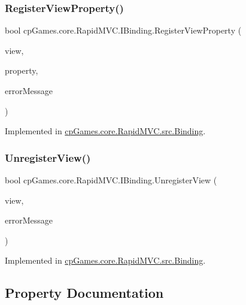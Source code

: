 \subsubsection{\texorpdfstring{RegisterViewProperty()}{RegisterViewProperty()}}
{\footnotesize\ttfamily bool cp\+Games.\+core.\+Rapid\+M\+V\+C.\+I\+Binding.\+Register\+View\+Property (\begin{DoxyParamCaption}\item[{\mbox{\hyperlink{interfacecp_games_1_1core_1_1_rapid_m_v_c_1_1_i_view}{I\+View}}}]{view,  }\item[{Property\+Info}]{property,  }\item[{out string}]{error\+Message }\end{DoxyParamCaption})}



Implemented in \mbox{\hyperlink{classcp_games_1_1core_1_1_rapid_m_v_c_1_1src_1_1_binding_aebd156eee7ea9bd0aea09c36b3a32a95}{cp\+Games.\+core.\+Rapid\+M\+V\+C.\+src.\+Binding}}.

\mbox{\label{interfacecp_games_1_1core_1_1_rapid_m_v_c_1_1_i_binding_ab36c868f3a9163935a650c30663f7a97}} 
\subsubsection{\texorpdfstring{UnregisterView()}{UnregisterView()}}
{\footnotesize\ttfamily bool cp\+Games.\+core.\+Rapid\+M\+V\+C.\+I\+Binding.\+Unregister\+View (\begin{DoxyParamCaption}\item[{\mbox{\hyperlink{interfacecp_games_1_1core_1_1_rapid_m_v_c_1_1_i_view}{I\+View}}}]{view,  }\item[{out string}]{error\+Message }\end{DoxyParamCaption})}



Implemented in \mbox{\hyperlink{classcp_games_1_1core_1_1_rapid_m_v_c_1_1src_1_1_binding_a09b069af4432f3652799483a7dd41fee}{cp\+Games.\+core.\+Rapid\+M\+V\+C.\+src.\+Binding}}.



\subsection{Property Documentation}
\mbox{\label{interfacecp_games_1_1core_1_1_rapid_m_v_c_1_1_i_binding_ad4ea0596cb7a0ef820717785e1e5a4ef}} 
